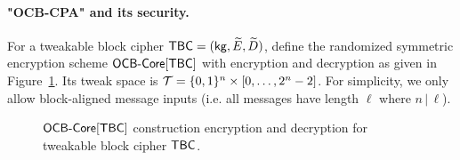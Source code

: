 \paragraph{"OCB-CPA" and its security.} For a tweakable block cipher $\mathsf{TBC} = ({\sf kg}, \widetilde{E}, \widetilde{D})$, define the randomized symmetric encryption scheme $\mathsf{OCB\mbox{-} Core}[\mathsf{TBC}]$ with encryption and decryption as given in Figure~\ref{fig:ocbcore}. Its tweak space is $\mathcal{T} = \{0,1\}^{n}\times [0, \ldots, 2^{n}-2]$. For 
simplicity, we only allow block-aligned message inputs (i.e. all messages have length $\ell$ where $n\,|\, \ell$).


\begin{figure}[h]
\centering
{}
\caption{$\mathsf{OCB\mbox{-} Core}[\mathsf{TBC}]$ construction encryption and decryption for tweakable block cipher $\mathsf{TBC}$.}
\label{fig:ocbcore}
\end{figure}


